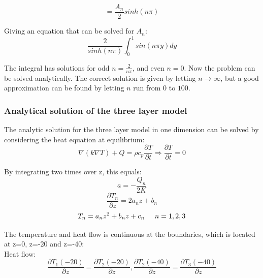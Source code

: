 \documentclass[10pt,a4paper]{article}
\begin{document}
\begin{equation}
= \frac{A_n}{2}sinh(n\pi) 
\end{equation}

\noindent Giving an equation that can be solved for $A_n$:\\

\begin{equation}
\frac{2}{sinh(n\pi)}\int_0^1sin(n\pi y) dy
\end{equation}

\noindent The integral has solutions for odd $n = \frac{2}{n\pi}$, and even $n = 0$. Now the problem can be solved analytically. The correct solution is given by letting $n \rightarrow \infty$, but a good approximation can be found by letting $n$ run from $0$ to $100$. 
\vspace{0.5cm}
\subsubsection*{Analytical solution of the three layer model}

\noindent The analytic solution for the three layer model in one dimension can be solved by considering the heat equation at equilibrium:\\

\begin{equation}
\nabla(k\nabla T) +Q=\rho c_p \frac{\partial T}{\partial t} \Rightarrow \frac{\partial T}{\partial t}=0
\end{equation}

\noindent By integrating two times over z, this equals:
\begin{equation}
a=-\frac{Q_n}{2K}
\end{equation}
\begin{equation}
\frac{\partial T_n}{\partial z}=2a_nz+b_n
\end{equation}
\begin{equation}\label{plotequation}
T_n=a_nz^2+b_nz+c_n \hspace{0.5cm} n= 1,2,3
\end{equation}

\noindent The temperature and heat flow is continuous at the boundaries, which is located at z=0, z=-20 and z=-40:\\

\noindent Heat flow:
\begin{equation}
\frac{ \partial T_1(-20)}{\partial z}=\frac{\partial T_2(-20)}{\partial z},
\frac{\partial T_2(-40)}{\partial z}=\frac{\partial T_3(-40)}{\partial z}
\end{equation}
\end{document}
